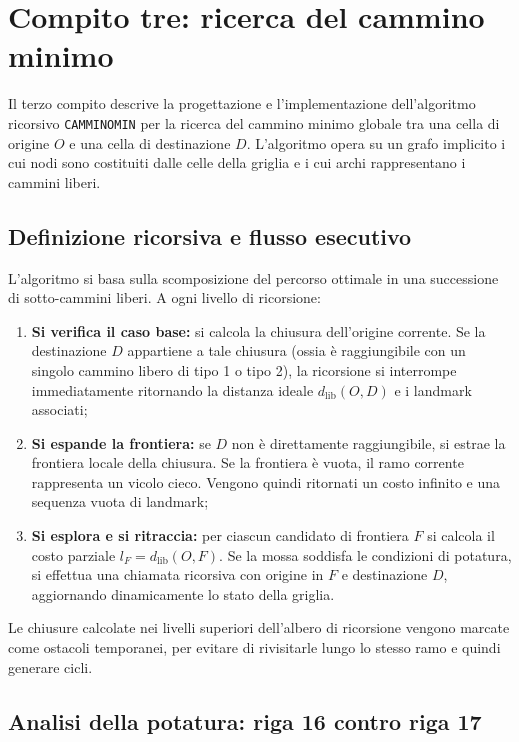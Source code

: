 \section{Compito tre: ricerca del cammino minimo}

Il terzo compito descrive la progettazione e l'implementazione dell'algoritmo ricorsivo \texttt{CAMMINOMIN} per la ricerca del cammino minimo globale tra una cella di origine $O$ e una cella di destinazione $D$. L'algoritmo opera su un grafo implicito i cui nodi sono costituiti dalle celle della griglia e i cui archi rappresentano i cammini liberi.

\subsection{Definizione ricorsiva e flusso esecutivo}

L'algoritmo si basa sulla scomposizione del percorso ottimale in una successione di sotto-cammini liberi. A ogni livello di ricorsione:
\begin{enumerate}
    \item \textbf{Si verifica il caso base:} si calcola la chiusura dell'origine corrente. Se la destinazione $D$ appartiene a tale chiusura (ossia è raggiungibile con un singolo cammino libero di tipo 1 o tipo 2), la ricorsione si interrompe immediatamente ritornando la distanza ideale $d_{\text{lib}}(O,D)$ e i landmark associati;
    \item \textbf{Si espande la frontiera:} se $D$ non è direttamente raggiungibile, si estrae la frontiera locale della chiusura. Se la frontiera è vuota, il ramo corrente rappresenta un vicolo cieco. Vengono quindi ritornati un costo infinito e una sequenza vuota di landmark;
    \item \textbf{Si esplora e si ritraccia:} per ciascun candidato di frontiera $F$ si calcola il costo parziale $l_F = d_{\text{lib}}(O,F)$. Se la mossa soddisfa le condizioni di potatura, si effettua una chiamata ricorsiva con origine in $F$ e destinazione $D$, aggiornando dinamicamente lo stato della griglia.
\end{enumerate}

Le chiusure calcolate nei livelli superiori dell'albero di ricorsione vengono marcate come ostacoli temporanei, per evitare di rivisitarle lungo lo stesso ramo e quindi generare cicli.

\subsection{Analisi della potatura: riga 16 contro riga 17}

